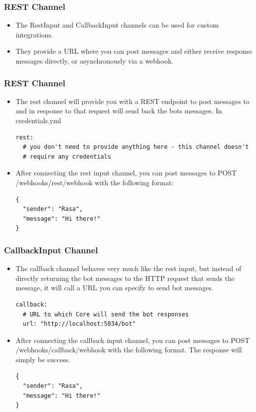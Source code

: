  \begin{frame}[fragile]\frametitle{REST Channel}
 \begin{itemize}
\item The RestInput and CallbackInput channels can be used for custom integrations. 
\item They provide a URL where you can post messages and either receive response messages directly, or asynchronously via a webhook.
\end{itemize}

\end{frame} 

 \begin{frame}[fragile]\frametitle{REST Channel}
 \begin{itemize}
\item The rest channel will provide you with a REST endpoint to post messages to and in response to that request will send back the bots messages. In credentials.yml
\begin{lstlisting}
rest:
  # you don't need to provide anything here - this channel doesn't
  # require any credentials
\end{lstlisting}
\item After connecting the rest input channel, you can post messages to POST /webhooks/rest/webhook with the following format:
\begin{lstlisting}
{
  "sender": "Rasa",
  "message": "Hi there!"
}
\end{lstlisting}
\end{itemize}

\end{frame} 

 \begin{frame}[fragile]\frametitle{CallbackInput Channel}
 \begin{itemize}
\item The callback channel behaves very much like the rest input, but instead of directly returning the bot messages to the HTTP request that sends the message, it will call a URL you can specify to send bot messages.
\begin{lstlisting}
callback:
  # URL to which Core will send the bot responses
  url: "http://localhost:5034/bot"
\end{lstlisting}
\item After connecting the callback input channel, you can post messages to POST /webhooks/callback/webhook with the following format. The response will simply be success.
\begin{lstlisting}
{
  "sender": "Rasa",
  "message": "Hi there!"
}
\end{lstlisting}
\end{itemize}

\end{frame} 

